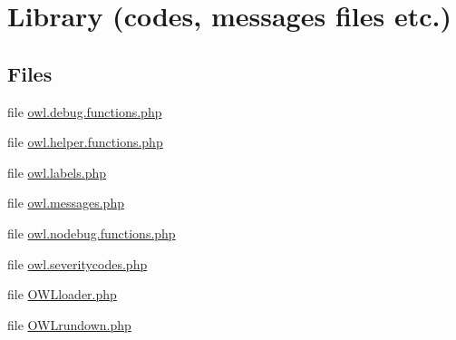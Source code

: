 \section{Library (codes, messages files etc.)}
\label{group__OWL__LIBRARY}
\subsection*{Files}
\begin{DoxyCompactItemize}
\item 
file \hyperlink{owl_8debug_8functions_8php}{owl.debug.functions.php}
\item 
file \hyperlink{owl_8helper_8functions_8php}{owl.helper.functions.php}
\item 
file \hyperlink{owl_8labels_8php}{owl.labels.php}
\item 
file \hyperlink{owl_8messages_8php}{owl.messages.php}
\item 
file \hyperlink{owl_8nodebug_8functions_8php}{owl.nodebug.functions.php}
\item 
file \hyperlink{owl_8severitycodes_8php}{owl.severitycodes.php}
\item 
file \hyperlink{OWLloader_8php}{OWLloader.php}
\item 
file \hyperlink{OWLrundown_8php}{OWLrundown.php}
\end{DoxyCompactItemize}
